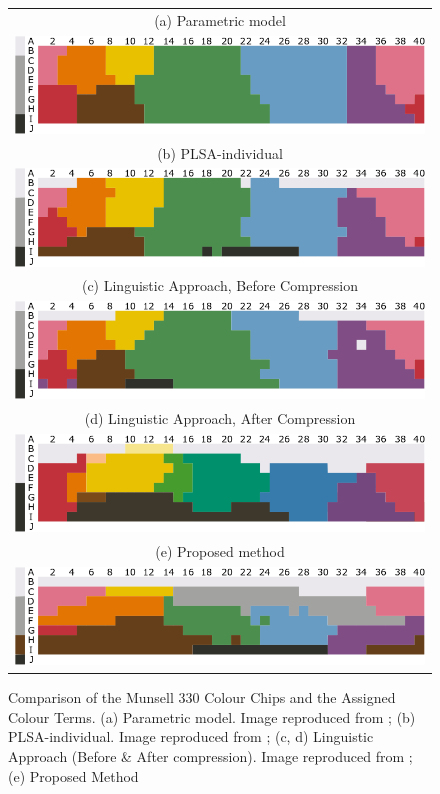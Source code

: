 \begin{figure}[htb!]
  \centering
\begin{tabular}{c}
 (a) Parametric model \\
 \includegraphics[width=0.7\linewidth]{image/analysis/munsell_a.png}   \\
 (b) PLSA-individual  \\
 \includegraphics[width=0.7\linewidth]{image/analysis/munsell_b.png}   \\
 (c) Linguistic Approach, Before Compression \\
 \includegraphics[width=0.7\linewidth]{image/analysis/munsell_c.png}   \\
 (d) Linguistic Approach, After Compression \\
 \includegraphics[width=0.7\linewidth]{image/analysis/munsell_e.png}  \\
 (e) Proposed method\\
 \includegraphics[width=0.7\linewidth]{image/analysis/munsell_d.png}   \\
\end{tabular}
\caption[Comparison of the Munsell 330 Colour Chips and the Assigned Colour Terms]{Comparison of the Munsell 330 Colour Chips and the Assigned Colour Terms. (a) Parametric model. Image reproduced from ; (b) PLSA-individual. Image reproduced from ; (c, d) Linguistic Approach (Before \& After compression). Image reproduced from ; (e) Proposed Method } \label{fig:munsell_compare}
\end{figure}


